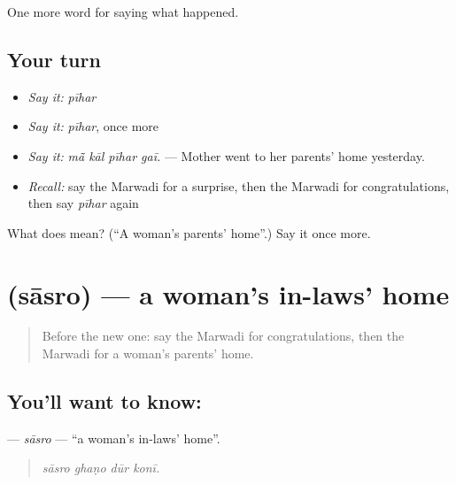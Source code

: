 \begin{grammarlens}[title={What you've built}]
One more word for saying what happened.
\end{grammarlens}

\subsection*{Your turn}
\begin{itemize}
\raggedright
  \item \emph{Say it:} \emph{pīhar}
  \item \emph{Say it:} \emph{pīhar}, once more
  \item \emph{Say it:} \emph{mā̃ kāl pīhar gaī.} — Mother went to her parents' home yesterday.
  \item \emph{Recall:} say the Marwadi for a surprise, then the Marwadi for congratulations, then say \emph{pīhar} again
\end{itemize}

\begin{tcolorbox}[breakable,colback=teal!4,colframe=teal!35!black,title={Before you move on}]
What does  mean? (\textquotedblleft{}A woman's parents' home\textquotedblright{}.) Say it once more.
\end{tcolorbox}
\section[\texorpdfstring{\mw{सासरो} (sāsro)}{सासरो (sāsro)}]{ (sāsro) — a woman's in-laws' home}

\label{lesson:MW-C246-sasro}



\begin{quote}
Before the new one: say the Marwadi for congratulations, then the Marwadi for a woman's parents' home.
\end{quote}

\subsection*{You'll want to know: }
\textbf{} — \emph{sāsro} — \textquotedblleft{}a woman's in-laws' home\textquotedblright{}.

\begin{quote}
   
\end{quote}

\begin{quote}
\emph{sāsro ghaṇo dūr konī.}
\end{quote}

